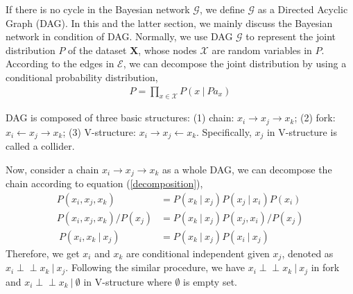 \documentclass[twoside,11pt]{article}
\begin{document}
If there is no cycle in the Bayesian network $\mathcal G$, we define $\mathcal G$ as a Directed Acyclic Graph (DAG). In this and the latter section, we mainly discuss the Bayesian network in condition of DAG. Normally, we use DAG $\mathcal G$ to represent the joint distribution $P$ of the dataset $\mathbf X$, whose nodes $\mathcal X$ are random variables in $P$. According to the edges in $\mathcal E$, we can decompose the joint distribution by using a conditional probability distribution, 
\begin{align}
\label{decomposition}
P=\prod_{x\in \mathcal X} P(x\ |\ Pa_x)
\end{align}

DAG is composed of three basic structures: (1) chain: $x_i\to x_j \to x_k$; (2) fork: $x_i\gets x_j \to x_k$; (3) V-structure: $x_i\to x_j \gets x_k$. Specifically, $x_j$ in V-structure is called a collider.

Now, consider a chain $x_i\to x_j \to x_k$ as a whole DAG, we can decompose the chain according to equation (\ref{decomposition}), 
\begin{align*}
P(x_i, x_j ,x_k)&=P(x_k\ |\ x_j)P(x_j\ |\ x_i)P(x_i)\\
P(x_i, x_j, x_k)/P(x_j)&=P(x_k\ |\ x_j)P(x_j, x_i)/P(x_j)\\\
P(x_i, x_k\ |\ x_j)&=P(x_k\ |\ x_j)P(x_i\ |\ x_j)
\end{align*}
Therefore, we get $x_i$ and $x_k$ are conditional independent given $x_j$, denoted as $x_i\perp\!\!\!\perp x_k\ |\ x_j$. Following the similar procedure, we have $x_i\perp\!\!\!\perp x_k\ |\ x_j$ in fork and $x_i\perp\!\!\!\perp x_k\ |\ \emptyset$ in V-structure where $\emptyset$ is empty set.
\end{document}
